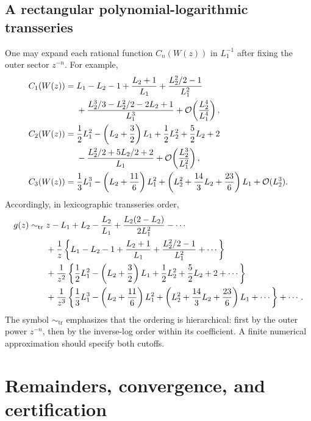 \documentclass[11pt,a4paper]{article}
\numberwithin{equation}{section}
\theoremstyle{definition}
\theoremstyle{remark}
\newcommand{\Ord}{\mathcal O}
\newcommand{\Lone}{L_1}
\newcommand{\Ltwo}{L_2}
\newcommand{\Ccoef}{C}
\begin{document}
\subsection{A rectangular polynomial-logarithmic transseries}

One may expand each rational function \(\Ccoef_n(W(z))\) in
\(\Lone^{-1}\) after fixing the outer sector \(z^{-n}\).  For example,
\begin{align}
 \Ccoef_1(W(z))={}&\Lone-\Ltwo-1
 +\frac{\Ltwo+1}{\Lone}
 +\frac{\Ltwo^2/2-1}{\Lone^2}
 \notag\\
 &+\frac{\Ltwo^3/3-\Ltwo^2/2-2\Ltwo+1}{\Lone^3}
 +\Ord\!\left(\frac{\Ltwo^4}{\Lone^4}\right),
 \label{eq:C1-log-expanded}\\
 \Ccoef_2(W(z))={}&\frac12\Lone^2-
 \left(\Ltwo+\frac32\right)\Lone
 +\frac12\Ltwo^2+\frac52\Ltwo+2
 \notag\\
 &-\frac{\Ltwo^2/2+5\Ltwo/2+2}{\Lone}
 +\Ord\!\left(\frac{\Ltwo^3}{\Lone^2}\right),
 \label{eq:C2-log-expanded}\\
 \Ccoef_3(W(z))={}&\frac13\Lone^3-
 \left(\Ltwo+\frac{11}{6}\right)\Lone^2
 +\left(\Ltwo^2+\frac{14}{3}\Ltwo+\frac{23}{6}\right)\Lone
 +\Ord(\Ltwo^3).
 \label{eq:C3-log-expanded}
\end{align}
Accordingly, in lexicographic transseries order,
\begin{align}
 g(z)\sim_{\mathrm{tr}}{}&
 z-\Lone+\Ltwo-\frac{\Ltwo}{\Lone}
 +\frac{\Ltwo(2-\Ltwo)}{2\Lone^2}-\cdots
 \notag\\
 &+\frac1z\left\{
 \Lone-\Ltwo-1+\frac{\Ltwo+1}{\Lone}
 +\frac{\Ltwo^2/2-1}{\Lone^2}+\cdots\right\}
 \notag\\
 &+\frac1{z^2}\left\{
 \frac12\Lone^2-\left(\Ltwo+\frac32\right)\Lone
 +\frac12\Ltwo^2+\frac52\Ltwo+2+\cdots\right\}
 \notag\\
 &+\frac1{z^3}\left\{
 \frac13\Lone^3-\left(\Ltwo+\frac{11}{6}\right)\Lone^2
 +\left(\Ltwo^2+\frac{14}{3}\Ltwo+\frac{23}{6}\right)\Lone
 +\cdots\right\}
 +\cdots.
 \label{eq:full-transseries-rectangular}
\end{align}
The symbol \(\sim_{\mathrm{tr}}\) emphasizes that the ordering is
hierarchical: first by the outer power \(z^{-n}\), then by the inverse-log
order within its coefficient.  A finite numerical approximation should
specify both cutoffs.

\section{Remainders, convergence, and certification}
\end{document}
